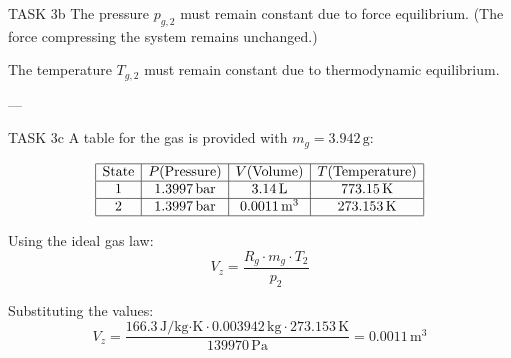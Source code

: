 TASK 3b  
The pressure \( p_{g,2} \) must remain constant due to force equilibrium.  
(The force compressing the system remains unchanged.)  

The temperature \( T_{g,2} \) must remain constant due to thermodynamic equilibrium.  

---

TASK 3c  
A table for the gas is provided with \( m_g = 3.942 \, \text{g} \):  

\[
\begin{array}{|c|c|c|c|}
\hline
\text{State} & P (\text{Pressure}) & V (\text{Volume}) & T (\text{Temperature}) \\
\hline
1 & 1.3997 \, \text{bar} & 3.14 \, \text{L} & 773.15 \, \text{K} \\
\hline
2 & 1.3997 \, \text{bar} & 0.0011 \, \text{m}^3 & 273.153 \, \text{K} \\
\hline
\end{array}
\]

Using the ideal gas law:  
\[
V_z = \frac{R_g \cdot m_g \cdot T_2}{p_2}
\]

Substituting the values:  
\[
V_z = \frac{166.3 \, \text{J/kg·K} \cdot 0.003942 \, \text{kg} \cdot 273.153 \, \text{K}}{139970 \, \text{Pa}} = 0.0011 \, \text{m}^3
\]